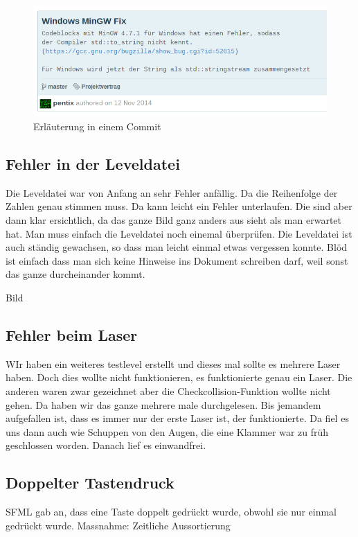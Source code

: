 \documentclass[12pt,a4paper]{scrartcl}
\begin{document}
\begin{figure}[h]
\centering
\includegraphics[scale=0.8]{img/e419eef.png}
\caption{Erläuterung in einem Commit}
\end{figure}

\subsection{Fehler in der Leveldatei}
Die Leveldatei war von Anfang an sehr Fehler anfällig. Da die Reihenfolge der Zahlen  genau stimmen muss. Da kann leicht ein Fehler unterlaufen. Die sind aber dann klar ersichtlich, da das ganze Bild ganz anders aus sieht als man erwartet hat. Man muss einfach die Leveldatei noch einemal überprüfen. Die Leveldatei ist auch ständig gewachsen, so dass man leicht einmal etwas vergessen konnte. Blöd ist einfach dass man sich keine Hinweise ins Dokument schreiben darf, weil sonst das ganze durcheinander kommt.

Bild

\subsection{Fehler beim Laser}
WIr haben ein weiteres testlevel erstellt und dieses mal sollte es mehrere Laser haben. Doch dies wollte nicht funktionieren, es funktionierte genau ein Laser. Die anderen waren zwar gezeichnet aber die Checkcollision-Funktion wollte nicht gehen. Da haben wir das ganze mehrere male durchgelesen. Bis jemandem aufgefallen ist, dass es immer nur der erste Laser ist, der funktionierte. Da fiel es uns dann auch wie Schuppen von den Augen, die eine Klammer war zu früh geschlossen worden. Danach lief es einwandfrei.

\subsection{Doppelter Tastendruck}
SFML gab an, dass eine Taste doppelt gedrückt wurde, obwohl sie nur einmal gedrückt wurde. Massnahme: Zeitliche Aussortierung
\end{document}
